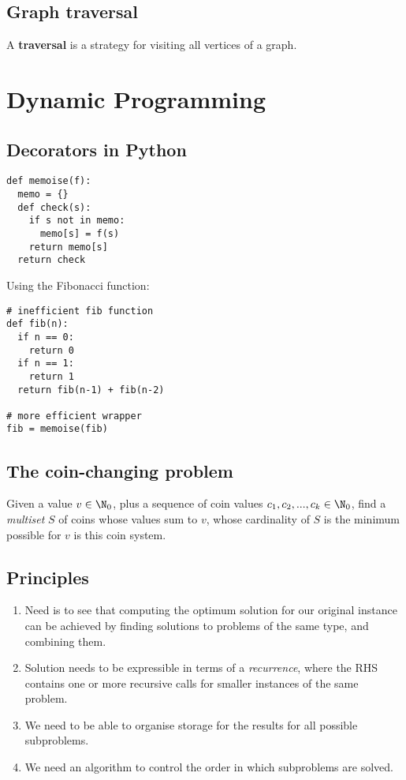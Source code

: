 \documentclass{article}
\begin{document}
\subsection{Graph traversal}

\begin{definition}
	A \textbf{traversal} is a strategy for visiting all vertices of a graph.
\end{definition} 

\section{Dynamic Programming}

\subsection{Decorators in Python}

\begin{verbatim}
def memoise(f):
  memo = {}
  def check(s):
    if s not in memo:
      memo[s] = f(s)
    return memo[s]
  return check
\end{verbatim}
\begin{example}
Using the Fibonacci function:
\begin{verbatim}
# inefficient fib function
def fib(n):
  if n == 0:
    return 0
  if n == 1:
    return 1
  return fib(n-1) + fib(n-2)

# more efficient wrapper
fib = memoise(fib)
\end{verbatim}
\end{example}

\subsection{The coin-changing problem}

\begin{definition}
	Given a value $v\in\N_0$, plus a sequence of coin values $c_1,c_2,...,c_k\in\N_0$,
	find a \emph{multiset} $S$ of coins whose values sum to $v$, whose cardinality
	of $S$ is the minimum possible for $v$ is this coin system.
\end{definition}

\subsection{Principles}

\begin{enumerate}
	\item Need is to see that computing the optimum solution for our original instance
		  can be achieved by finding solutions to problems of the same type, and combining
		  them.
    \item Solution needs to be expressible in terms of a \emph{recurrence}, where the RHS
		  contains one or more recursive calls for smaller instances of the same problem.
    \item We need to be able to organise storage for the results for all possible subproblems.
    \item We need an algorithm to control the order in which subproblems are solved.
\end{enumerate}
\end{document}
